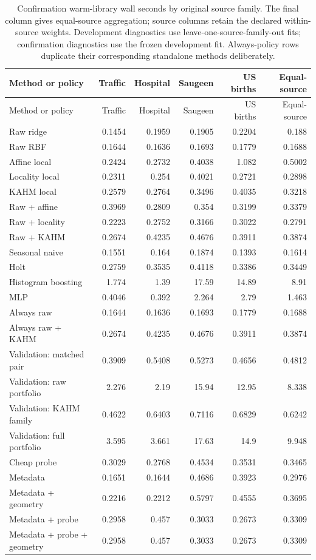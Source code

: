 {\small\setlength{\tabcolsep}{4pt}
\begin{longtable}{lrrrrr}
\caption{Confirmation warm-library wall seconds by original source family. The final column gives equal-source aggregation; source columns retain the declared within-source weights. Development diagnostics use leave-one-source-family-out fits; confirmation diagnostics use the frozen development fit. Always-policy rows duplicate their corresponding standalone methods deliberately.}\label{tab:source-confirmation-cost}\\
\toprule
Method or policy & Traffic & Hospital & Saugeen & US births & Equal-source \\
\midrule
\endfirsthead
\toprule
Method or policy & Traffic & Hospital & Saugeen & US births & Equal-source \\
\midrule
\endhead
Raw ridge & 0.1454 & 0.1959 & 0.1905 & 0.2204 & 0.188 \\
Raw RBF & 0.1644 & 0.1636 & 0.1693 & 0.1779 & 0.1688 \\
Affine local & 0.2424 & 0.2732 & 0.4038 & 1.082 & 0.5002 \\
Locality local & 0.2311 & 0.254 & 0.4021 & 0.2721 & 0.2898 \\
KAHM local & 0.2579 & 0.2764 & 0.3496 & 0.4035 & 0.3218 \\
Raw + affine & 0.3969 & 0.2809 & 0.354 & 0.3199 & 0.3379 \\
Raw + locality & 0.2223 & 0.2752 & 0.3166 & 0.3022 & 0.2791 \\
Raw + KAHM & 0.2674 & 0.4235 & 0.4676 & 0.3911 & 0.3874 \\
Seasonal naive & 0.1551 & 0.164 & 0.1874 & 0.1393 & 0.1614 \\
Holt & 0.2759 & 0.3535 & 0.4118 & 0.3386 & 0.3449 \\
Histogram boosting & 1.774 & 1.39 & 17.59 & 14.89 & 8.91 \\
MLP & 0.4046 & 0.392 & 2.264 & 2.79 & 1.463 \\
Always raw & 0.1644 & 0.1636 & 0.1693 & 0.1779 & 0.1688 \\
Always raw + KAHM & 0.2674 & 0.4235 & 0.4676 & 0.3911 & 0.3874 \\
Validation: matched pair & 0.3909 & 0.5408 & 0.5273 & 0.4656 & 0.4812 \\
Validation: raw portfolio & 2.276 & 2.19 & 15.94 & 12.95 & 8.338 \\
Validation: KAHM family & 0.4622 & 0.6403 & 0.7116 & 0.6829 & 0.6242 \\
Validation: full portfolio & 3.595 & 3.661 & 17.63 & 14.9 & 9.948 \\
Cheap probe & 0.3029 & 0.2768 & 0.4534 & 0.3531 & 0.3465 \\
Metadata & 0.1651 & 0.1644 & 0.4686 & 0.3923 & 0.2976 \\
Metadata + geometry & 0.2216 & 0.2212 & 0.5797 & 0.4555 & 0.3695 \\
Metadata + probe & 0.2958 & 0.457 & 0.3033 & 0.2673 & 0.3309 \\
Metadata + probe + geometry & 0.2958 & 0.457 & 0.3033 & 0.2673 & 0.3309 \\
\bottomrule
\end{longtable}
}
